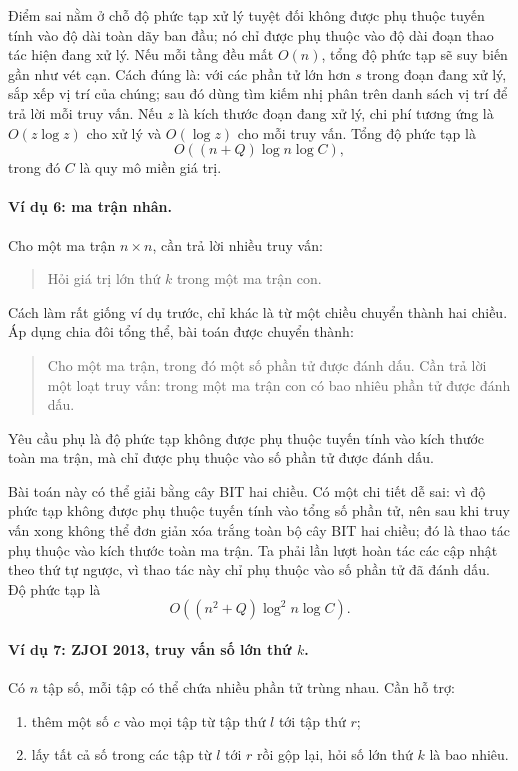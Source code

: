 \documentclass[11pt]{article}
\begin{document}
Điểm sai nằm ở chỗ độ phức tạp xử lý tuyệt đối không được phụ thuộc tuyến
tính vào độ dài toàn dãy ban đầu; nó chỉ được phụ thuộc vào độ dài đoạn thao
tác hiện đang xử lý. Nếu mỗi tầng đều mất \(O(n)\), tổng độ phức tạp sẽ suy
biến gần như vét cạn. Cách đúng là: với các phần tử lớn hơn \(s\) trong đoạn
đang xử lý, sắp xếp vị trí của chúng; sau đó dùng tìm kiếm nhị phân trên
danh sách vị trí để trả lời mỗi truy vấn. Nếu \(z\) là kích thước đoạn đang
xử lý, chi phí tương ứng là \(O(z\log z)\) cho xử lý và \(O(\log z)\) cho
mỗi truy vấn. Tổng độ phức tạp là
\[
  O((n+Q)\log n\log C),
\]
trong đó \(C\) là quy mô miền giá trị.

\paragraph{Ví dụ 6: ma trận nhân.}
Cho một ma trận \(n\times n\), cần trả lời nhiều truy vấn:
\begin{quote}
Hỏi giá trị lớn thứ \(k\) trong một ma trận con.
\end{quote}

Cách làm rất giống ví dụ trước, chỉ khác là từ một chiều chuyển thành hai
chiều. Áp dụng chia đôi tổng thể, bài toán được chuyển thành:
\begin{quote}
Cho một ma trận, trong đó một số phần tử được đánh dấu. Cần trả lời một loạt
truy vấn: trong một ma trận con có bao nhiêu phần tử được đánh dấu.
\end{quote}
Yêu cầu phụ là độ phức tạp không được phụ thuộc tuyến tính vào kích thước
toàn ma trận, mà chỉ được phụ thuộc vào số phần tử được đánh dấu.

Bài toán này có thể giải bằng cây BIT hai chiều. Có một chi tiết dễ sai: vì
độ phức tạp không được phụ thuộc tuyến tính vào tổng số phần tử, nên sau khi
truy vấn xong không thể đơn giản xóa trắng toàn bộ cây BIT hai chiều; đó là
thao tác phụ thuộc vào kích thước toàn ma trận. Ta phải lần lượt hoàn tác
các cập nhật theo thứ tự ngược, vì thao tác này chỉ phụ thuộc vào số phần tử
đã đánh dấu. Độ phức tạp là
\[
  O((n^2+Q)\log^2 n\log C).
\]

\paragraph{Ví dụ 7: ZJOI 2013, truy vấn số lớn thứ \(k\).}
Có \(n\) tập số, mỗi tập có thể chứa nhiều phần tử trùng nhau. Cần hỗ trợ:
\begin{enumerate}
  \item thêm một số \(c\) vào mọi tập từ tập thứ \(l\) tới tập thứ \(r\);
  \item lấy tất cả số trong các tập từ \(l\) tới \(r\) rồi gộp lại, hỏi số
  lớn thứ \(k\) là bao nhiêu.
\end{enumerate}
\end{document}
